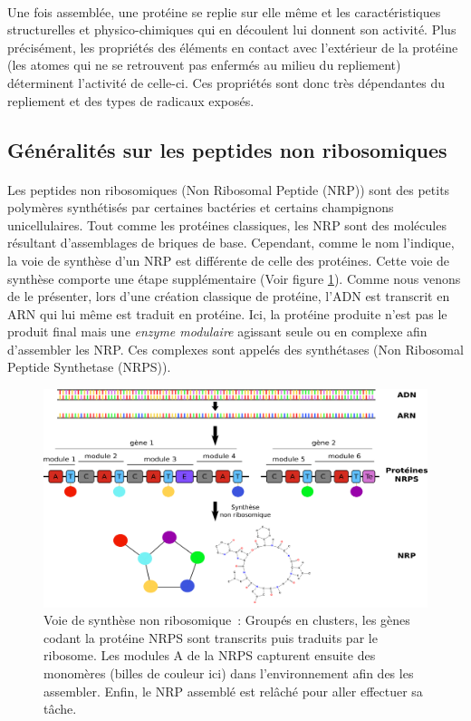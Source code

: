 \documentclass[12pt,french,twoside]{report}
\begin{document}
\paragraph{}Une fois assemblée, une protéine se replie sur elle même et les caractéristiques structurelles et physico-chimiques qui en découlent lui donnent son activité.
Plus précisément, les propriétés des éléments en contact avec l'extérieur de la protéine (les atomes qui ne se retrouvent pas enfermés au milieu du repliement) déterminent l'activité de celle-ci.
Ces propriétés sont donc très dépendantes du repliement et des types de radicaux exposés.



\subsection{Généralités sur les peptides non ribosomiques}
\paragraph{}Les peptides non ribosomiques (Non Ribosomal Peptide (NRP)) sont des petits polymères synthétisés par certaines bactéries et certains champignons unicellulaires.
Tout comme les protéines classiques, les NRP sont des molécules résultant d'assemblages de briques de base.
Cependant, comme le nom l'indique, la voie de synthèse d'un NRP est différente de celle des protéines.
Cette voie de synthèse comporte une étape supplémentaire (Voir figure \ref{global}).
Comme nous venons de le présenter, lors d'une création classique de protéine, l'ADN est transcrit en ARN qui lui même est traduit en protéine.
Ici, la protéine produite n'est pas le produit final mais une \textit{enzyme modulaire} agissant seule ou en complexe afin d'assembler les NRP.
Ces complexes sont appelés des synthétases (Non Ribosomal Peptide Synthetase (NRPS)).

\begin{figure}[h!]
  \begin{center}
    \includegraphics[width=450px]{Figures/bio/Intro/synthese.png}
    \caption{\label{global}Voie de synthèse non ribosomique~:
    Groupés en clusters, les gènes codant la protéine NRPS sont transcrits puis traduits par le ribosome.
    Les modules A de la NRPS capturent ensuite des monomères (billes de couleur ici) dans l'environnement afin des les assembler.
    Enfin, le NRP assemblé est relâché pour aller effectuer sa tâche.
    }
  \end{center}
\end{figure}
\end{document}
